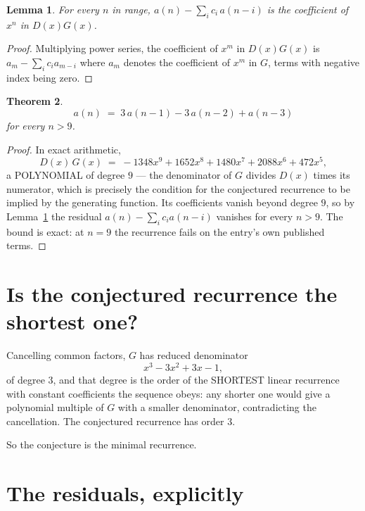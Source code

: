 \documentclass[11pt,a4paper]{article}
\theoremstyle{plain}
\newtheorem{theorem}{Theorem}
\newtheorem{lemma}[theorem]{Lemma}
\theoremstyle{definition}
\begin{document}
\begin{lemma}\label{lem:key}
For every $n$ in range, $a(n)-\sum_i c_i\,a(n-i)$ is the coefficient of $x^{n}$ in
$D(x)G(x)$.
\end{lemma}

\begin{proof}
Multiplying power series, the coefficient of $x^{m}$ in $D(x)G(x)$ is
$a_m-\sum_i c_i a_{m-i}$ where $a_m$ denotes the coefficient of $x^{m}$ in $G$, terms with
negative index being zero.
\end{proof}

\begin{theorem}
\[
a(n)\;=\;3\,a(n-1) - 3\,a(n-2) + a(n-3)
\]
for every $n>9$.
\end{theorem}

\begin{proof}
In exact arithmetic,
\[
D(x)\,G(x)\;=\;- 1348 x^{9} + 1652 x^{8} + 1480 x^{7} + 2088 x^{6} + 472 x^{5},
\]
a POLYNOMIAL of degree $9$ --- the denominator of $G$ divides $D(x)$ times its numerator,
which is precisely the condition for the conjectured recurrence to be implied by the
generating function. Its coefficients vanish beyond degree $9$, so by
Lemma~\ref{lem:key} the residual $a(n)-\sum_ic_ia(n-i)$ vanishes for every
$n>9$. The bound is exact: at $n=9$ the recurrence fails on the entry's own published terms.
\end{proof}

\section{Is the conjectured recurrence the shortest one?}

Cancelling common factors, $G$ has reduced denominator
\[
x^{3} - 3 x^{2} + 3 x - 1,
\]
of degree $3$, and that degree is the order of the SHORTEST linear recurrence with
constant coefficients the sequence obeys: any shorter one would give a polynomial multiple of
$G$ with a smaller denominator, contradicting the cancellation. The conjectured recurrence has
order $3$.

So the conjecture is the minimal recurrence.

\section{The residuals, explicitly}
\end{document}
